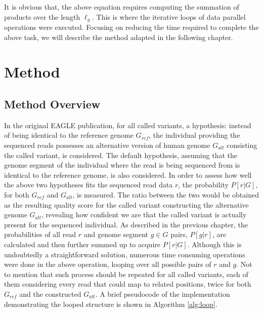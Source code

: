 \documentclass{PHlab-thesis}
\begin{document}
It is obvious that, the above equation requires computing the summation of products over the length $\ell_g$. This is where the iterative loops of data parallel operations were executed. Focusing on reducing the time required to complete the above task, we will describe the method adapted in the following chapter.

\chapter{Method}
\section{Method Overview}
In the original EAGLE publication, for all called variants, a hypothesis: instead of being identical to the reference genome $G_{ref}$, the individual providing the sequenced reads possesses an alternative version of human genome $G_{alt}$ consisting the called variant, is considered. The default hypothesis, assuming that the genome segment of the individual where the read is being sequenced from is identical to the reference genome, is also considered. In order to assess how well the above two hypotheses fits the sequenced read data $r$, the probability $P[r|G]$, for both $G_{ref}$ and $G_{alt}$, is measured. The ratio between the two would be obtained as the resulting quality score for the called variant constructing the alternative genome $G_{alt}$, revealing how confident we are that the called variant is actually present for the sequenced individual. As described in the previous chapter, the probabilities of all read $r$ and genome segment ${g\in G}$ pairs, $P[g|r]$, are calculated and then further summed up to acquire $P[r|G]$. Although this is undoubtedly a straightforward solution, numerous time consuming operations were done in the above operation, looping over all possible pairs of $r$ and $g$. Not to mention that such process should be repeated for all called variants, each of them considering every read that could map to related positions, twice for both $G_{ref}$ and the constructed $G_{alt}$. A brief pseudocode of the implementation demonstrating the looped structure is shown in Algorithm \ref{alg:loop}.
\end{document}
